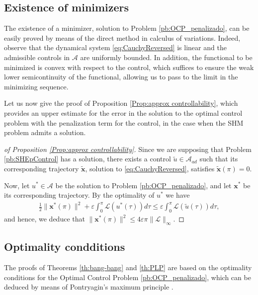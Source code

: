\documentclass[twocolumn]{autart}    %
\begin{document}
\subsection{Existence of minimizers}
\label{sec: exist mini}

The existence of a minimizer, solution to Problem \ref{pb:OCP_penalizado}, can be easily proved by means of the direct method in calculus of variations. Indeed,  observe that the dynamical system \eqref{eq:CauchyReversed} is linear and the admissible controls in $\mathcal{A}$ are uniformly bounded.
In addition, the functional to be minimized is convex with respect to the control, which suffices to ensure the weak lower semicontinuity of the functional, allowing us to pass to the limit in the minimizing sequence.

Let us now give the proof of Proposition \ref{Prop:approx controllability}, which provides an upper estimate for the error in the solution to the optimal control problem with the penalization term for the control, in the case when the SHM problem admits a solution. 

\bigskip

\begin{proof}[of Proposition \ref{Prop:approx controllability}]
Since we are supposing that Problem \ref{pb:SHEpControl} has a solution, there exists a control $\tilde{u}\in \mathcal{A}_{ad}$ such that its corresponding trajectory $\tilde{\bm{x}}$, solution to \eqref{eq:CauchyReversed}, satisfies $\tilde{\bm{x}}(\pi) = 0$. 

Now, let $u^\ast\in \mathcal{A}$ be the solution to Problem \ref{pb:OCP_penalizado}, and let $\bm{x}^\ast$ be its corresponding trajectory. By the optimality of $u^\ast$ we have
\begin{align*}
	\frac{1}{2} \| \bm{x}^\ast(\pi)\|^2 +\varepsilon \int_0^\pi \mathcal{L}(u^\ast(\tau))d\tau \leq \varepsilon \int_0^\pi \mathcal{L}(\tilde{u}(\tau))d\tau,
\end{align*}
and hence, we deduce that $\| \bm{x}^\ast (\pi)\|^2 \leq 4 \varepsilon \pi \| \mathcal{L}\|_\infty.$
\end{proof}

\subsection{Optimality condditions}
\label{sec:opti cond}

The proofs of Theorems \ref{th:bang-bang} and \ref{th:PLP} are based on the optimality conditions for the Optimal Control Problem \ref{pb:OCP_penalizado}, which can be deduced by means of Pontryagin's maximum principle \cite[Chapter~2.7]{bryson1975applied}.
\end{document}
